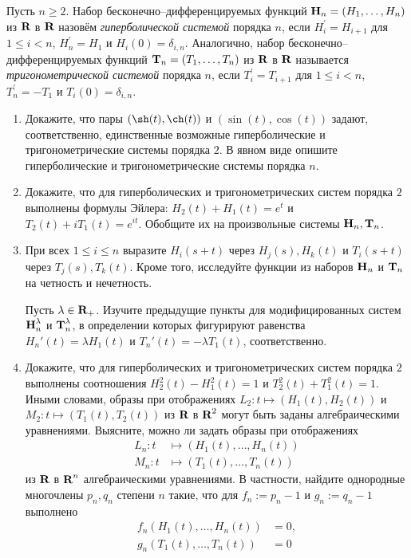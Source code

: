 \newcommand{\mmH}{\text{\bfseries H}}
\newcommand{\mmT}{\text{\bfseries T}}

Пусть $n \geq 2$. Набор бесконечно--дифференцируемых функций $\mmH_n = (H_1, \ldots, H_n)$ из $\text{\bfseries R}$ в $\text{\bfseries R}$ назовём {\itshape гиперболической системой} порядка $n$, если $H_i^\prime = H_{i+1}$ для $1 \leq i < n$, $H_n^\prime = H_1$ и $H_i(0) = \delta_{i,n}$. Аналогично, набор бесконечно--дифференцируемых функций $\mmT_n = (T_1, \ldots, T_n)$ из $\text{\bfseries R}$ в $\text{\bfseries R}$ называется {\itshape тригонометрической системой} порядка $n$, если $T_i^\prime = T_{i+1}$ для $1 \leq i < n$, $T_n^\prime = - T_1$ и $T_i(0) = \delta_{i,n}$. 

\begin{enumerate}
\item Докажите, что пары $\left(\sh(t), \ch(t)  \right)$ и $\left(\sin(t), \cos(t)\right)$ задают, соответственно, единственные возможные гиперболические и тригонометрические системы порядка $2$. В явном виде опишите гиперболические и тригонометрические системы порядка $n$. 

\item Докажите, что для гиперболических и тригонометрических систем порядка $2$ выполнены
формулы Эйлера: $H_2(t) + H_1(t) = e^t$ и $T_2(t) + i T_1(t) = e^{it}.$ Обобщите их на произвольные системы $\mmH_n, \mmT_n$.

\item При всех $1 \leq i \leq n$ выразите $H_i(s+t)$ через $H_j(s), H_k(t)$ и $T_i(s+t)$ через $T_j(s), T_k(t)$. Кроме того, исследуйте функции из наборов $\mmH_n$ и $\mmT_n$ на четность и нечетность.

Пусть $\lambda \in \text{\bfseries R}_+$. Изучите предыдущие пункты для модифицированных систем $\mmH_n^\lambda$ и $\mmT_n^\lambda$, в определении которых фигурируют равенства $H_n'(t) = \lambda H_1(t)$ и $T_n'(t) = -\lambda T_1(t)$, соответственно.
\item Докажите, что для гиперболических и тригонометрических систем порядка $2$ выполнены соотношения $H_2^2(t) - H_1^2(t) = 1$ и $T_2^2(t) + T_1^2(t) = 1.$ Иными словами, образы при отображениях $L_2: t \mapsto (H_1(t), H_2(t))$ и $M_2: t \mapsto (T_1(t), T_2(t))$ из $\text{\bfseries R}$ в $\text{\bfseries R}^2$ могут быть заданы алгебраическими уравнениями. Выясните, можно ли задать образы при отображениях 
\begin{align*}
L_n: t &\longmapsto (H_1(t), \ldots, H_n(t)) \\
M_n: t &\longmapsto (T_1(t), \ldots, T_n(t))
\end{align*}
из $\text{\bfseries R}$ в $\text{\bfseries R}^n$ алгебраическими уравнениями. В частности, найдите однородные многочлены $p_n, q_n$ степени $n$ такие, что для $f_n:=p_n - 1$ и $g_n := q_n-1$ выполнено
\begin{align*}
f_n(H_1(t), \ldots, H_n(t)) &= 0, \\
g_n(T_1(t), \ldots, T_n(t)) &= 0
\end{align*} 


\end{enumerate}
